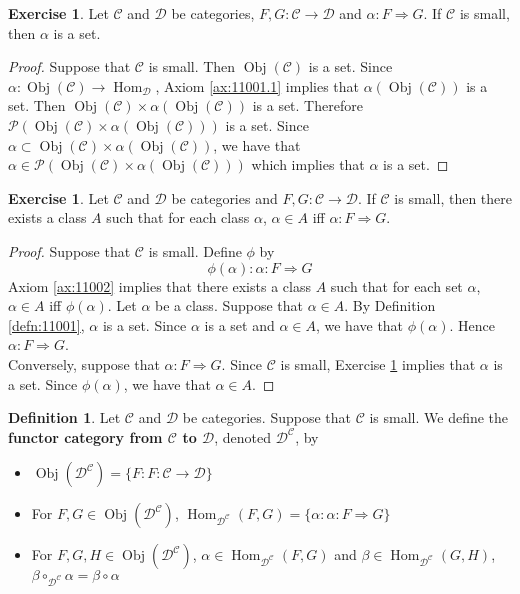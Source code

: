 \documentclass[12pt]{amsart}
\theoremstyle{definition}
\newtheorem{defn}[definition]{Definition}
\newtheorem{ex}[definition]{Exercise}
\newcommand{\al}{\alpha}
\newcommand{\be}{\beta}
\newcommand{\MC}{\mathcal{C}}
\newcommand{\MD}{\mathcal{D}}
\newcommand{\MP}{\mathcal{P}}
\DeclareMathOperator{\Obj}{Obj}
\DeclareMathOperator{\Hom}{Hom}
\DeclareMathOperator*{\0}{\mbf{0}}
\DeclareMathOperator*{\1}{\mbf{1}}
\newcommand{\lex}[1]{\label{ex:#1}}
\newcommand{\ld}[1]{\label{defn:#1}}
\newcommand{\rex}[1]{Exercise \ref{ex:#1}}
\newcommand{\rd}[1]{Definition \ref{defn:#1}}
\newcommand{\rax}[1]{Axiom \ref{ax:#1}}
\begin{document}
	\begin{ex} \lex{14004}
		Let $\MC$ and $\MD$ be categories, $F,G: \MC \rightarrow \MD$ and $\al: F \Rightarrow G$. If $\MC$ is small, then $\al$ is a set.
	\end{ex}

	\begin{proof}
		Suppose that $\MC$ is small. Then $\Obj(\MC)$ is a set. Since $\al: \Obj(\MC) \rightarrow \Hom_{\MD}$, \rax{11001.1} implies that $\al(\Obj(\MC))$ is a set. Then $ \Obj(\MC) \times \al(\Obj(\MC))$ is a set. Therefore $\MP(\Obj(\MC) \times \al(\Obj(\MC)))$ is a set. Since $\al \subset \Obj(\MC) \times \al(\Obj(\MC))$, we have that $\al \in \MP(\Obj(\MC) \times \al(\Obj(\MC)))$ which implies that $\al$ is a set. 
	\end{proof}

	\begin{ex} \lex{14005}
			Let $\MC$ and $\MD$ be categories and $F,G: \MC \rightarrow \MD$. If $\MC$ is small, then there exists a class $A$ such that for each class $\al$, $\al \in A$ iff $\al: F \Rightarrow G$. 
	\end{ex}

	\begin{proof}
		Suppose that $\MC$ is small. Define $\phi$ by 
		$$\phi(\al): \al: F \Rightarrow G$$
		\rax{11002} implies that there exists a class $A$ such that for each set $\al$, $\al \in A$ iff $\phi(\al)$. 
		Let $\al$ be a class. Suppose that $\al \in A$. By \rd{11001}, $\al$ is a set. Since $\al$ is a set and $\al \in A$, we have that $\phi(\al)$. Hence $\al:F \Rightarrow G$. \\
		Conversely, suppose that $\al: F \Rightarrow G$.  Since $\MC$ is small, \rex{14004} implies that $\al$ is a set. Since $\phi(\al)$, we have that $\al \in A$. 
	\end{proof}
	
	\begin{defn} \ld{14006}
		Let $\MC$ and $\MD$ be categories. Suppose that $\MC$ is small. We define the \textbf{functor category from $\MC$ to $\MD$}, denoted $\MD^{\MC}$, by 
		\begin{itemize}
			\item $\Obj(\MD^{\MC}) = \{F: F: \MC \rightarrow \MD\}$
			\item For $F, G \in \Obj(\MD^{\MC})$, $\Hom_{\MD^{\MC}}(F, G) = \{\al: \al: F \Rightarrow G \}$
			\item For $F, G, H \in \Obj(\MD^{\MC})$, $\al \in \Hom_{\MD^{\MC}}(F, G)$ and $\be \in \Hom_{\MD^{\MC}}(G, H)$, 
			$\be \circ_{\MD^{\MC}} \al = \be \circ \al $
		\end{itemize} 
	\end{defn}
\end{document}

